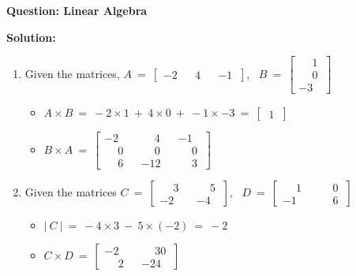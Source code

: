 \documentclass[12pt]{article}
\begin{document}
\textbf{Question: Linear Algebra}

\BlankLine
\BlankLine

\textbf{Solution:} 
\BlankLine
\begin{enumerate}
	\item Given the matrices, 
	$ A \ = \ \begin{bmatrix}
		-2  && 4 && -1 \ 
	\end{bmatrix}$, \ $ B  \ = \ \begin{bmatrix} \phantom{-}1 \ \\ \phantom{-}0 \ \\ -3 \ \end{bmatrix}$ 
	
	\begin{itemize}
		\item $A \times B \ = \ -2 \times 1 \ + \ 4 \times 0 \ + \ -1 \times -3 \ = \ \begin{bmatrix}
			\ 1 \
		\end{bmatrix}$
		\BlankLine
		\item $B \times A \ = \ \begin{bmatrix}
			-2 && \phantom{-}4 && -1 \ \\
			\phantom{-}0 && \phantom{-}0 && \phantom{-}0  \ \\
			\phantom{-}6 && -12 && \phantom{-}3 \ 
		\end{bmatrix}$
		
	\end{itemize}

	\item Given the matrices $ C \ = \ \begin{bmatrix}
		\phantom{-}3 && \phantom{-}5 \ \\
		-2 && -4 \
	\end{bmatrix} $,  \ $ D  \ = \ \begin{bmatrix} \phantom{-}1 && \phantom{-}0 \ \\ -1 && \phantom{-}6 \  \end{bmatrix}$ 

	\begin{itemize}
		\item $ | \ C \  | \ = \ -4 \times 3 \ - \ 5 \times (-2) \ = \ -2 $
		
		\BlankLine
		\BlankLine
		
		\item $ C \times D  \ = \ \begin{bmatrix}
			-2 && \phantom{-}30 \ \\
			\phantom{-}2 && -24 \ 
		\end{bmatrix}$
	

\end{itemize}
\end{enumerate}
\end{document}
